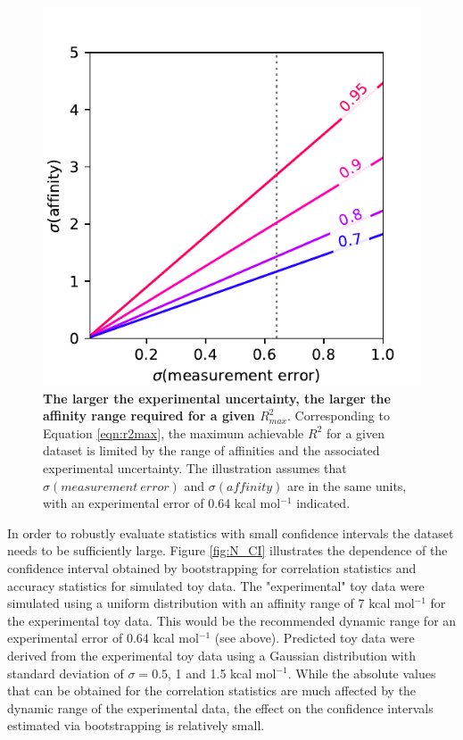 \documentclass[9pt,bestpractices]{livecoms}
\begin{document}
\begin{figure}
    \includegraphics[width=0.95\linewidth]{figures/R2max.pdf}
    \caption{\textbf{The larger the experimental uncertainty, the larger the affinity range required for a given $R^2_{max}$}. Corresponding to Equation \ref{eqn:r2max}, the maximum achievable $R^2$ for a given dataset is limited by the range of affinities and the associated experimental uncertainty. The illustration assumes that $\sigma(measurement\ error)$ and $\sigma(affinity)$ are in the same units, with an experimental error of 0.64 kcal mol$^{-1}$ indicated.}
    \label{fig:r2max}
\end{figure}

In order to robustly evaluate statistics with small confidence intervals the dataset needs to be sufficiently large. Figure \ref{fig:N_CI} illustrates the dependence of the confidence interval obtained by bootstrapping for correlation statistics and accuracy statistics for simulated toy data. The "experimental" toy data were simulated using a uniform distribution with an affinity range of 7 kcal mol$^{-1}$ for the experimental toy data. This would be the recommended dynamic range for an experimental error of 0.64 kcal mol$^{-1}$ (see above). Predicted toy data were derived from the experimental toy data using a Gaussian distribution with standard deviation of $\sigma = 0.5$, 1 and 1.5 kcal mol$^{-1}$. While the absolute values that can be obtained for the correlation statistics are much affected by the dynamic range of the experimental data, the effect on the confidence intervals estimated via bootstrapping is relatively small.
\end{document}

